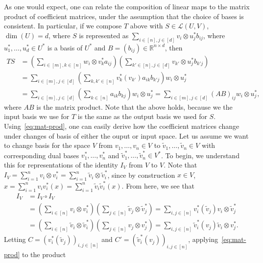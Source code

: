 \documentclass[11pt]{article}
\theoremstyle{plain}
\theoremstyle{plain}
\newcommand{\R}{\ensuremath{\mathbb{R}}}
\begin{document}
As one would expect, one can relate the composition of linear maps to the matrix
product of coefficient matrices, under the assumption that the choice of bases
is consistent. In particular, if we compose $T$ above with $S \in
\mathcal{L}(U,V)$, $\dim(U) = d$, where $S$ is represented as $\sum_{i \in [n],
j \in [d]} v_i \otimes u_j^* b_{ij}$, where $u_1^*,\dots,u_d^* \in U^*$ is a
basis of $U^*$ and $B = (b_{ij}) \in \R^{n \times d}$, then 
\begin{align}
T S &= (\sum_{i \in [m], k \in [n]} w_i \otimes v_k^* a_{ij})(\sum_{k' \in [n], j
\in [d]} v_{k'} \otimes u_j^* b_{k'j}) \nonumber \\
   &= \sum_{i \in [m], j \in [d]}(\sum_{k,k' \in [n]}
v_k^*(v_{k'}) a_{ik} b_{k'j}) w_i \otimes u_j^*  \nonumber \\
   &= \sum_{i \in [m], j \in [d]} (\sum_{k \in [n]} a_{ik}
b_{kj}) w_i \otimes u_j^*  
   = \sum_{i \in [m], j \in [d]} (A B)_{ij}  w_i \otimes u_j^* \label{eq:mat-prod},
\end{align}
where $AB$ is the matrix product. Note that the above holds, because we the
input basis we use for $T$ is the same as the output basis we used for $S$.
Using~\eqref{eq:mat-prod}, one can easily derive how the coefficient matrices
change under changes of basis of either the ouput or input space. Let us assume
we want to change basis for the space $V$ from $v_1,\dots,v_n \in V$ to
$\tilde{v}_1,\dots,\tilde{v}_n \in V$ with corresponding dual bases
$v_1^*,\dots,v_n^*$ and $\tilde{v}_1^*,\dots,\tilde{v}_n^* \in V^*$. To begin, we
understand this for representations of the identity $I_V$ from $V$ to $V$. Note
that $I_V = \sum_{i=1}^n v_i \otimes v_i^* = \sum_{i=1}^n \tilde{v}_i \otimes
\tilde{v}_i^*$, since by construction $x \in V$, $x = \sum_{i=1}^n v_i v_i^*(x)
= \sum_{i=1}^n \tilde{v}_i \tilde{v}_i^*(x)$. From here, we see that
\begin{align}
I_V &= I_V \circ I_V \nonumber \\ 
    &= (\sum_{i \in [n]} v_i \otimes v_i^*)(\sum_{j \in [n]} \tilde{v}_j\otimes
\tilde{v}_j^*) = \sum_{i,j \in [n]} v_i^*(\tilde{v}_j) v_i \otimes \tilde{v}_j^*
 \label{eq:id1} \\
    &= (\sum_{i \in [n]} \tilde{v}_i \otimes
\tilde{v}_i^*)(\sum_{j \in [n]} v_j \otimes v_j^*) =
\sum_{i,j \in [n]} \tilde{v}_i^*(v_j) \tilde{v}_i \otimes v_j^*. \label{eq:id2}
\end{align}
Letting $C = (v_i^*(\tilde{v}_j))_{i,j \in [n]}$ and $C' =
(\tilde{v}^*_i(v_j))_{i,j \in [n]}$, applying~\eqref{eq:mat-prod} to the product
\end{document}
